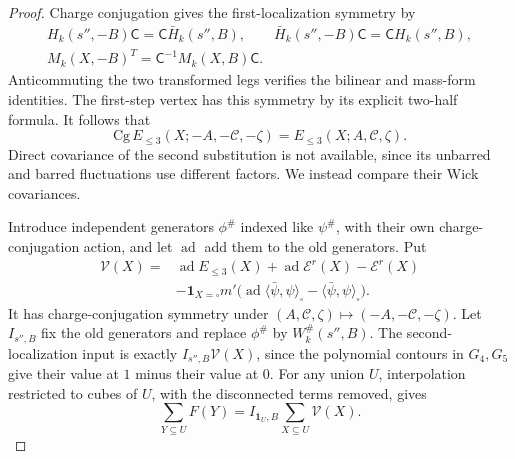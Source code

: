 \documentclass[11pt,letterpaper,reqno]{amsart}
\begin{document}
\begin{proof}
Charge conjugation gives the first-localization symmetry
by
\[
 \begin{gathered}
 H_k(s'',-B)\mathsf C=\mathsf C\bar H_k(s'',B),\qquad
 \bar H_k(s'',-B)\mathsf C=\mathsf C H_k(s'',B),\\
 M_k(X,-B)^T=\mathsf C^{-1}M_k(X,B)\mathsf C .
 \end{gathered}
\]
Anticommuting the two transformed legs verifies the
bilinear and mass-form identities. The first-step
vertex has this symmetry by its explicit two-half formula.
It follows that
\[
 \mathrm{Cg}\,E_{\le3}(X;-A,-\mathscr C,-\zeta)
                                        =E_{\le3}(X;A,\mathscr C,\zeta).
\]
Direct covariance of the second substitution is not
available, since its unbarred and barred fluctuations
use different factors. We instead compare their Wick
covariances.

Introduce independent generators $\phi^\#$ indexed like
$\psi^\#$, with their own charge-conjugation action,
and let $\operatorname{ad}$ add them to the old generators.
Put
\begin{align*}
 \mathcal V(X)
   ={}&\operatorname{ad}E_{\le3}(X)
      +\operatorname{ad}\mathscr E^r(X)-\mathscr E^r(X)\\
     &-\mathbf1_{X=\square}m'
          \big(\operatorname{ad}
                         \langle\bar\psi,\psi\rangle_\square
                                -\langle\bar\psi,\psi\rangle_\square\big).
\end{align*}
It has charge-conjugation symmetry under
$(A,\mathscr C,\zeta)\mapsto(-A,-\mathscr C,-\zeta)$.
Let $I_{s'',B}$ fix the old generators and replace
$\phi^\#$ by $W_k^\#(s'',B)$. The second-localization
input is exactly $I_{s'',B}\mathcal V(X)$, since
the polynomial contours in $G_4,G_5$ give their value
at $1$ minus their value at $0$.
For any union $U$, interpolation restricted to cubes
of $U$, with the disconnected terms removed, gives
\begin{equation}\label{eq:rgnl-subvolume-substitution}
 \sum_{Y\subseteq U}F(Y)=
                        I_{\mathbf1_U,B}\sum_{X\subseteq U}\mathcal V(X).
\end{equation}


\end{proof}
\end{document}
